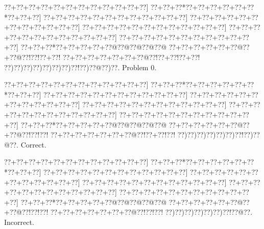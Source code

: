 \documentclass[a5paper]{article}
\begin{document}
\begin{center}
{\goo
\0??+\0??+\0??+\0??+\0??+\0??+\0??+\0??+\0??+\0??+\0??+\0??]
\0??+\0??+\0??*\0??+\0??+\0??+\0??+\0??+\0??*\0??+\0??+\0??]
\0??+\0??+\0??+\0??+\0??+\0??+\0??+\0??+\0??+\0??+\0??+\0??]
\0??+\0??+\0??+\0??+\0??+\0??+\0??+\0??+\0??+\0??+\0??+\0??]
\0??+\0??+\0??+\0??+\0??+\0??+\0??+\0??+\0??+\0??+\0??+\0??]
\0??+\0??+\0??+\0??+\0??+\0??+\0??+\0??+\0??+\0??+\0??+\0??]
\0??+\0??+\0??+\0??+\0??+\0??+\0??+\0??+\0??+\0??+\0??+\0??]
\0??+\0??+\0??*\0??+\0??+\0??+\0??+\0??@\0??@\0??@\0??@\0??@
\0??+\0??+\0??+\0??+\0??+\0??@\0??+\0??@\0??!\0??!\0??+\0??!
\0??+\0??+\0??+\0??+\0??+\0??+\0??@\0??!\0??+\0??!\0??+\0??!
\0??)\0??)\0??)\0??)\0??)\0??)\0??)\0??!\0??)\0??@\0??)\0??.
}
Problem 0.

\end{center}
\begin{center}
{\goo
\0??+\0??+\0??+\0??+\0??+\0??+\0??+\0??+\0??+\0??+\0??+\0??]
\0??+\0??+\0??*\0??+\0??+\0??+\0??+\0??+\0??*\0??+\0??+\0??]
\0??+\0??+\0??+\0??+\0??+\0??+\0??+\0??+\0??+\0??+\0??+\0??]
\0??+\0??+\0??+\0??+\0??+\0??+\0??+\0??+\0??+\0??+\0??+\0??]
\0??+\0??+\0??+\0??+\0??+\0??+\0??+\0??+\0??+\0??+\0??+\0??]
\0??+\0??+\0??+\0??+\0??+\0??+\0??+\0??+\0??+\0??+\0??+\0??]
\0??+\0??+\0??+\0??+\0??+\0??+\0??+\0??+\0??+\0??+\0??+\0??]
\0??+\0??+\0??*\0??+\0??+\0??+\0??+\0??@\0??@\0??@\0??@\0??@
\0??+\0??+\0??+\0??+\0??+\0??@\0??+\0??@\0??!\0??!\0??!
\0??+\0??+\0??+\0??+\0??+\0??+\0??@\0??!\0??+\0??!\0??!
\0??)\0??)\0??)\0??)\0??)\0??)\0??!\0??)\0??@\0??.
}
Correct. 

\end{center}
\begin{center}
{\goo
\0??+\0??+\0??+\0??+\0??+\0??+\0??+\0??+\0??+\0??+\0??+\0??]
\0??+\0??+\0??*\0??+\0??+\0??+\0??+\0??+\0??*\0??+\0??+\0??]
\0??+\0??+\0??+\0??+\0??+\0??+\0??+\0??+\0??+\0??+\0??+\0??]
\0??+\0??+\0??+\0??+\0??+\0??+\0??+\0??+\0??+\0??+\0??+\0??]
\0??+\0??+\0??+\0??+\0??+\0??+\0??+\0??+\0??+\0??+\0??+\0??]
\0??+\0??+\0??+\0??+\0??+\0??+\0??+\0??+\0??+\0??+\0??+\0??]
\0??+\0??+\0??+\0??+\0??+\0??+\0??+\0??+\0??+\0??+\0??+\0??]
\0??+\0??+\0??*\0??+\0??+\0??+\0??+\0??@\0??@\0??@\0??@\0??@
\0??+\0??+\0??+\0??+\0??+\0??@\0??+\0??@\0??!\0??!\0??!
\0??+\0??+\0??+\0??+\0??+\0??+\0??@\0??!\0??!\0??!
\0??)\0??)\0??)\0??)\0??)\0??)\0??!\0??@\0??.
}
Incorrect. 

\end{center}
\newpage
\end{document}

